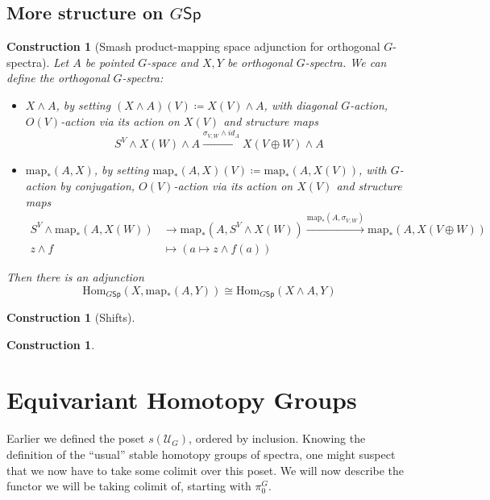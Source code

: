 \documentclass{scrartcl}
\newcommand{\Hom}{\mathrm{Hom}}
\newtheorem{cons}[subsection]{Construction}
\begin{document}
\subsection*{More structure on $G\mathsf{Sp}$}

\begin{cons}[Smash product-mapping space adjunction for orthogonal $G$-spectra]
    Let $A$ be pointed $G$-space and $X,Y$ be orthogonal $G$-spectra. We can define the orthogonal $G$-spectra:
    \begin{itemize}
        \item $X\wedge A$, by setting $(X\wedge A)(V)\coloneqq X(V)\wedge A$, with diagonal $G$-action, $O(V)$-action via its action on $X(V)$ and structure maps $$S^V\wedge X(W)\wedge A\xrightarrow{\sigma_{V,W}\wedge id_A} X(V\oplus W)\wedge A$$
        \item $\text{map}_*(A,X)$, by setting $\text{map}_*(A,X)(V)\coloneqq \text{map}_*(A,X(V))$, with $G$-action by conjugation, $O(V)$-action via its action on $X(V)$ and structure maps 
        \begin{align*}
            S^V\wedge \text{map}_*(A, X(W))&\to \text{map}_*(A, S^V\wedge X(W))\xrightarrow{\text{map}_*(A, \sigma_{V,W})} \text{map}_*(A, X(V\oplus W)) \\
            z\wedge f&\mapsto (a\mapsto z\wedge f(a))
        \end{align*}
    \end{itemize}
    Then there is an adjunction $$\Hom_{G\mathsf{Sp}}(X, \text{map}_*(A,Y))\cong\Hom_{G\mathsf{Sp}}(X\wedge A, Y)$$
\end{cons}

\begin{cons}[Shifts]
\end{cons}

\begin{cons}
\end{cons}

\section{Equivariant Homotopy Groups}

Earlier we defined the poset $s(\mathcal{U}_G)$, ordered by inclusion. Knowing the definition of the ``usual'' stable homotopy groups of spectra, one might suspect that we now have to take some colimit over this poset. We will now describe the functor we will be taking colimit of, starting with $\pi^G_0$.
\end{document}
